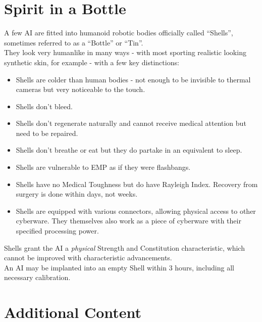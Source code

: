 \documentclass[12pt,a4paper,openany,usenames,dvipsnames]{book}
\begin{document}
	\chapter{Spirit in a Bottle}
	A few AI are fitted into humanoid robotic bodies officially called “Shells”, sometimes referred to as a “Bottle” or “Tin”.
	\\%
	They look very humanlike in many ways - with most sporting realistic looking synthetic skin, for example - with a few key distinctions:
	\vspace{-8mm}
	\begin{itemize}
		\setlength\itemsep{-8mm}
		\item Shells are colder than human bodies - not enough to be invisible to thermal cameras but very noticeable to the touch.
		\item Shells don’t bleed.
		\item Shells don’t regenerate naturally and cannot receive medical attention but need to be repaired.
		\item Shells don’t breathe or eat but they do partake in an equivalent to sleep.
		\item Shells are vulnerable to EMP as if they were flashbangs.
		\item Shells have no Medical Toughness but do have Rayleigh Index. Recovery from surgery is done within days, not weeks.
		\item Shells are equipped with various connectors, allowing physical access to other cyberware. They themselves also work as a piece of cyberware with their specified processing power.
	\end{itemize}
	\par
	Shells grant the AI a \emph{physical} Strength and Constitution characteristic, which cannot be improved with characteristic advancements.
	\\%
	An AI may be implanted into an empty Shell within 3 hours, including all necessary calibration.

	\chapter{Additional Content}
	\vspace{-18mm}
\end{document}
